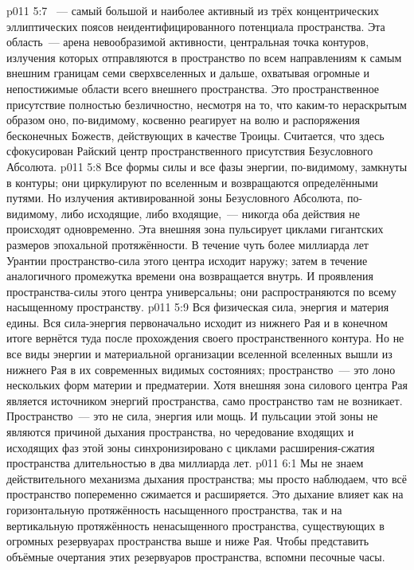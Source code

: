 \vs p011 5:7 \pc {}~--- самый большой и наиболее активный из трёх концентрических эллиптических поясов неидентифицированного потенциала пространства. Эта область~--- арена невообразимой активности, центральная точка контуров, излучения которых отправляются в пространство по всем направлениям к самым внешним границам семи сверхвселенных и дальше, охватывая огромные и непостижимые области всего внешнего пространства. Это пространственное присутствие полностью безличностно, несмотря на то, что каким\hyp{}то нераскрытым образом оно, по\hyp{}видимому, косвенно реагирует на волю и распоряжения бесконечных Божеств, действующих в качестве Троицы. Считается, что здесь сфокусирован Райский центр пространственного присутствия Безусловного Абсолюта.
\vs p011 5:8 Все формы силы и все фазы энергии, по\hyp{}видимому, замкнуты в контуры; они циркулируют по вселенным и возвращаются определёнными путями. Но излучения активированной зоны Безусловного Абсолюта, по\hyp{}видимому, либо исходящие, либо входящие,~--- никогда оба действия не происходят одновременно. Эта внешняя зона пульсирует циклами гигантских размеров эпохальной протяжённости. В течение чуть более миллиарда лет Урантии пространство\hyp{}сила этого центра исходит наружу; затем в течение аналогичного промежутка времени она возвращается внутрь. И проявления пространства\hyp{}силы этого центра универсальны; они распространяются по всему насыщенному пространству.
\vs p011 5:9 \pc Вся физическая сила, энергия и материя едины. Вся сила\hyp{}энергия первоначально исходит из нижнего Рая и в конечном итоге вернётся туда после прохождения своего пространственного контура. Но не все виды энергии и материальной организации вселенной вселенных вышли из нижнего Рая в их современных видимых состояниях; пространство~--- это лоно нескольких форм материи и предматерии. Хотя внешняя зона силового центра Рая является источником энергий пространства, само пространство там не возникает. Пространство~--- это не сила, энергия или мощь. И пульсации этой зоны не являются причиной дыхания пространства, но чередование входящих и исходящих фаз этой зоны синхронизировано с циклами расширения\hyp{}сжатия пространства длительностью в два миллиарда лет.
\vs p011 6:1 Мы не знаем действительного механизма дыхания пространства; мы просто наблюдаем, что всё пространство попеременно сжимается и расширяется. Это дыхание влияет как на горизонтальную протяжённость насыщенного пространства, так и на вертикальную протяжённость ненасыщенного пространства, существующих в огромных резервуарах пространства выше и ниже Рая. Чтобы представить объёмные очертания этих резервуаров пространства, вспомни песочные часы.
